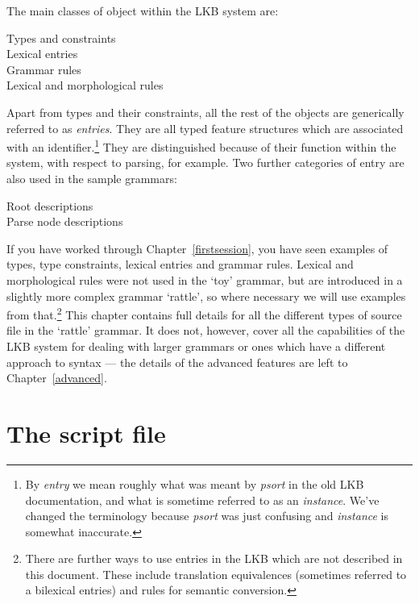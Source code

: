 \documentclass[12pt]{report}
\begin{document}
The main classes of object within the LKB system 
are:
\begin{description}
\item[Types and constraints]
\item[Lexical entries]
\item[Grammar rules]
\item[Lexical and morphological rules]
\end{description}
Apart from types and
their constraints, all the rest of the objects are generically referred to
as {\it entries}.
They are all typed feature structures which are associated 
with an identifier.\footnote{By {\it entry} we mean roughly
what was meant by {\it psort} in the old LKB documentation,
and what is sometime referred to as an {\it instance}.  
We've changed the terminology because {\it psort}
was just confusing and {\it instance} is somewhat inaccurate.}
They are distinguished because of their 
function within the system, with respect to
parsing, for example.
Two further categories of entry are also used in the sample
grammars:
\begin{description}
\item[Root descriptions]
\item[Parse node descriptions]
\end{description}

If you have worked through Chapter~\ref{firstsession}, you have seen
examples of types, type constraints, lexical entries and grammar rules.
Lexical and morphological rules were not used in the `toy' grammar,
but are introduced in a slightly more complex grammar
`rattle', so where necessary we will use examples from 
that.\footnote{There are further ways to use entries in the LKB which are
not described in this document.  These include 
translation equivalences (sometimes referred to
a bilexical entries) and rules for semantic conversion.}
This chapter contains full details for all the different
types of source file in the `rattle' grammar.
It does not, however, cover all the capabilities of the LKB system
for dealing with larger grammars or ones which have a different
approach to syntax --- the details of the advanced features
are left to Chapter~\ref{advanced}.

\section{The script file}
\label{script-intro}
\end{document}
